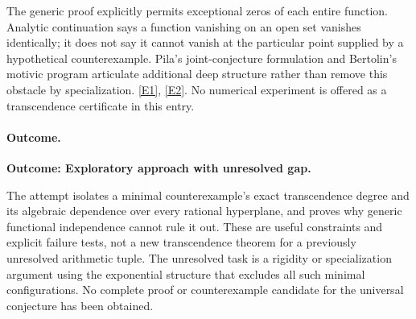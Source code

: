 \documentclass[11pt,a4paper]{article}
\newcommand{\eref}[2]{\hyperlink{extra:#1:#2}{[E#2]}}
\numberwithin{equation}{section}
\begin{document}
The generic proof explicitly permits exceptional zeros of each entire
function. Analytic continuation says a function vanishing on an open set
vanishes identically; it does not say it cannot vanish at the particular
point supplied by a hypothetical counterexample. Pila's joint-conjecture
formulation and Bertolin's motivic program articulate additional deep
structure rather than remove this obstacle by specialization.
\eref{28}{1}, \eref{28}{2}. No numerical experiment is offered as a
transcendence certificate in this entry.

\paragraph{Outcome.}
\textbf{Outcome: Exploratory approach with unresolved gap.}

The attempt isolates a minimal counterexample's exact transcendence degree
and its algebraic dependence over every rational hyperplane, and proves
why generic functional independence cannot rule it out. These are useful
constraints and explicit failure tests, not a new transcendence theorem
for a previously unresolved arithmetic tuple. The unresolved task is a
rigidity or specialization argument using the exponential structure that
excludes all such minimal configurations. No complete proof or
counterexample candidate for the universal conjecture has been obtained.

\end{document}
